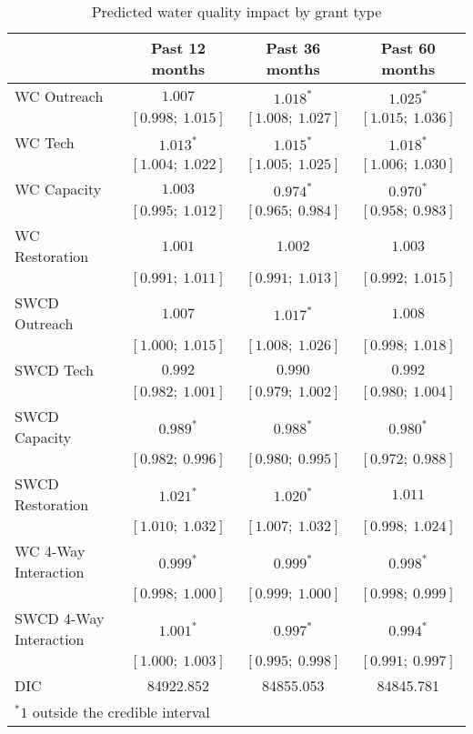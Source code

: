 
\begin{table}
\caption{Predicted water quality impact by grant type}
\begin{center}
\begin{tabular}{l c c c }
\hline
                       & Past 12 months & Past 36 months & Past 60 months \\
\hline
WC Outreach            & $1.007$           & $1.018^{*}$       & $1.025^{*}$       \\
                       & $[0.998;\ 1.015]$ & $[1.008;\ 1.027]$ & $[1.015;\ 1.036]$ \\
WC Tech                & $1.013^{*}$       & $1.015^{*}$       & $1.018^{*}$       \\
                       & $[1.004;\ 1.022]$ & $[1.005;\ 1.025]$ & $[1.006;\ 1.030]$ \\
WC Capacity            & $1.003$           & $0.974^{*}$       & $0.970^{*}$       \\
                       & $[0.995;\ 1.012]$ & $[0.965;\ 0.984]$ & $[0.958;\ 0.983]$ \\
WC Restoration         & $1.001$           & $1.002$           & $1.003$           \\
                       & $[0.991;\ 1.011]$ & $[0.991;\ 1.013]$ & $[0.992;\ 1.015]$ \\
SWCD Outreach          & $1.007$           & $1.017^{*}$       & $1.008$           \\
                       & $[1.000;\ 1.015]$ & $[1.008;\ 1.026]$ & $[0.998;\ 1.018]$ \\
SWCD Tech              & $0.992$           & $0.990$           & $0.992$           \\
                       & $[0.982;\ 1.001]$ & $[0.979;\ 1.002]$ & $[0.980;\ 1.004]$ \\
SWCD Capacity          & $0.989^{*}$       & $0.988^{*}$       & $0.980^{*}$       \\
                       & $[0.982;\ 0.996]$ & $[0.980;\ 0.995]$ & $[0.972;\ 0.988]$ \\
SWCD Restoration       & $1.021^{*}$       & $1.020^{*}$       & $1.011$           \\
                       & $[1.010;\ 1.032]$ & $[1.007;\ 1.032]$ & $[0.998;\ 1.024]$ \\
WC 4-Way Interaction   & $0.999^{*}$       & $0.999^{*}$       & $0.998^{*}$       \\
                       & $[0.998;\ 1.000]$ & $[0.999;\ 1.000]$ & $[0.998;\ 0.999]$ \\
SWCD 4-Way Interaction & $1.001^{*}$       & $0.997^{*}$       & $0.994^{*}$       \\
                       & $[1.000;\ 1.003]$ & $[0.995;\ 0.998]$ & $[0.991;\ 0.997]$ \\
\hline
DIC                    & 84922.852         & 84855.053         & 84845.781         \\
\hline
\multicolumn{4}{l}{\scriptsize{$^* 1$ outside the credible interval}}
\end{tabular}
\label{table:typefunding}
\end{center}
\end{table}
